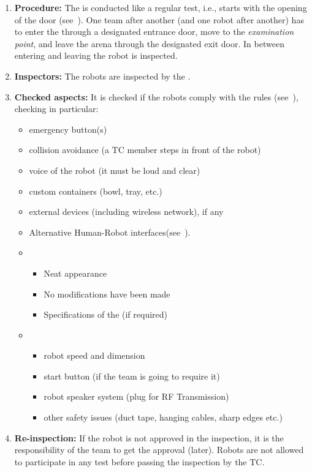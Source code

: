 \begin{enumerate}
	\item \textbf{Procedure:} The  is conducted like a regular test, i.e., starts with the opening of the door (see~). One team after another (and one robot after another) has to enter the \Arena{} through a designated entrance door, move to the \textit{examination point}, and leave the arena through the designated exit door. In between entering and leaving the robot is inspected.
	\item \textbf{Inspectors:} The robots are inspected by the .
	\item \textbf{Checked aspects:} It is checked if the robots comply with the rules (see~), checking in particular:
	\begin{itemize}
		\item emergency button(s)
		\item collision avoidance (a TC member steps in front of the robot)
		\item voice of the robot (it must be loud and clear)
		\item custom containers (bowl, tray, etc.)
		\item external devices (including wireless network), if any
		\item Alternative Human-Robot interfaces(see~).
		\item {}
		\begin{itemize}
			\item Neat appearance
			\item No modifications have been made
			\item Specifications of the  (if required)
		\end{itemize}
		\item {}
		\begin{itemize}
			\item robot speed and dimension
			\item start button (if the team is going to require it)
			\item robot speaker system (plug for RF Transmission)
			\item other safety issues (duct tape, hanging cables, sharp edges etc.)
		\end{itemize}
	\end{itemize}
	\item \textbf{Re-inspection:} If the robot is not approved in the inspection, it is the responsibility of the team to get the approval (later). Robots are not allowed to participate in any test before passing the inspection by the TC.

\end{enumerate}
